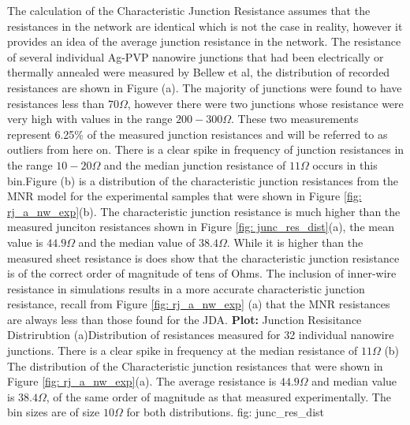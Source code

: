 The calculation of the Characteristic Junction Resistance assumes that the resistances in the network are identical which is not the case in reality, however it provides an idea of the average junction resistance in the network. The resistance of several individual Ag-PVP nanowire junctions that had been electrically or thermally annealed were measured by Bellew et al, the distribution of recorded resistances are shown in Figure \label{fig: junc_res_dist}(a). The majority of junctions were found to have resistances less than $70 \Omega$, however there were two junctions whose resistance were very high with values in the range $200 - 300 \Omega$. These two measurements represent 6.25\% of the measured junction resistances and will be referred to as outliers from here on. There is a clear spike in frequency of junction resistances in the range $10 - 20 \Omega$ and the median junction resistance of $11 \Omega$ occurs in this bin.Figure \label{fig: junc_res_dist}(b) is a distribution of the characteristic junction resistances from the MNR model for the experimental samples that were shown in Figure \ref{fig: rj_a_nw_exp}(b). The characteristic junction resistance is much higher than the measured junciton resistances shown in Figure \ref{fig: junc_res_dist}(a), the mean value is $44.9\Omega$ and the median value of $38.4\Omega$. While it is higher than the measured sheet resistance is does show that the characteristic junction resistance is of the correct order of magnitude of tens of Ohms. The inclusion of inner-wire resistance in simulations results in a more accurate characteristic junction resistance, recall from Figure \ref{fig: rj_a_nw_exp} (a) that the MNR resistances are always less than those found for the JDA. 
{\textbf{Plot:} Junction Resisitance Distrirubtion}
{(a)Distribution of resistances measured for 32 individual nanowire junctions. There is a clear spike in frequency at the median resistance of $11 \Omega$ (b) The distribution of the Characteristic junction resistances that were shown in Figure \ref{fig: rj_a_nw_exp}(a). The average resistance is $44.9\Omega$ and median value is $38.4\Omega$, of the same order of magnitude as that measured experimentally. The bin sizes are of size $10 \Omega$ for both distributions.}
{fig: junc_res_dist}

